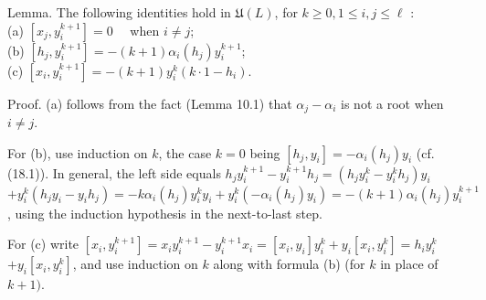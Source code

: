 \documentclass[10pt]{article}
\begin{document}
Lemma. The following identities hold in $\mathfrak{U}(L)$, for $k \geq 0,1 \leq i, j \leq \ell$ :\\
(a) $\left[x_{j}, y_{i}^{k+1}\right]=0 \quad$ when $i \neq j$;\\
(b) $\left[h_{j}, y_{i}^{k+1}\right]=-(k+1) \alpha_{i}\left(h_{j}\right) y_{i}^{k+1}$;\\
(c) $\left[x_{i}, y_{i}^{k+1}\right]=-(k+1) y_{i}^{k}\left(k \cdot 1-h_{i}\right)$.

Proof. (a) follows from the fact (Lemma 10.1) that $\alpha_{j}-\alpha_{i}$ is not a root when $i \neq j$.

For (b), use induction on $k$, the case $k=0$ being $\left[h_{j}, y_{i}\right]=-\alpha_{i}\left(h_{j}\right) y_{i}$ (cf. (18.1)). In general, the left side equals $h_{j} y_{i}^{k+1}-y_{i}^{k+1} h_{j}=\left(h_{j} y_{i}^{k}-y_{i}^{k} h_{j}\right) y_{i}$ $+y_{i}^{k}\left(h_{j} y_{i}-y_{i} h_{j}\right)=-k \alpha_{i}\left(h_{j}\right) y_{i}^{k} y_{i}+y_{i}^{k}\left(-\alpha_{i}\left(h_{j}\right) y_{i}\right)=-(k+1) \alpha_{i}\left(h_{j}\right) y_{i}^{k+1}$, using the induction hypothesis in the next-to-last step.

For (c) write $\left[x_{i}, y_{i}^{k+1}\right]=x_{i} y_{i}^{k+1}-y_{i}^{k+1} x_{i}=\left[x_{i}, y_{i}\right] y_{i}^{k}+y_{i}\left[x_{i}, y_{i}^{k}\right]=h_{i} y_{i}^{k}$ $+y_{i}\left[x_{i}, y_{i}^{k}\right]$, and use induction on $k$ along with formula (b) (for $k$ in place of $k+1)$.
\end{document}
